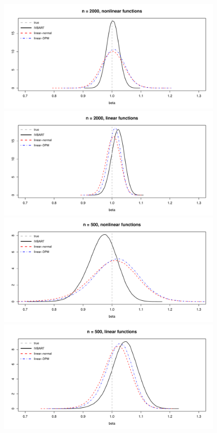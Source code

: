 \begin{figure}
\hspace*{-.3in}
\includegraphics[scale=.3]{14-11_1-2_2000_alldraws_densities.pdf}
\hspace{.1in}
\includegraphics[scale=.3]{14-31_1-2_2000_alldraws_densities.pdf} \\
\hspace*{-.3in}
\includegraphics[scale=.3]{14-11_1-2_500_alldraws_densities.pdf}
\hspace{.1in}
\includegraphics[scale=.3]{14-31_1-2_500_alldraws_densities.pdf} 

\end{figure}
